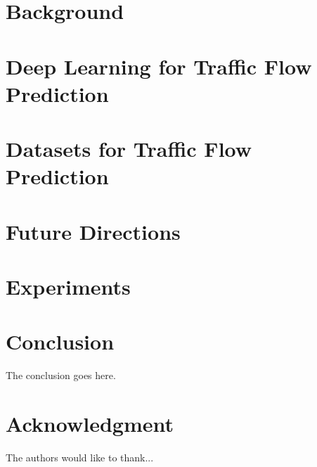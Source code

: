 \documentclass[conference]{IEEEtran}
\begin{document}
\section{Background}

\section{Deep Learning for Traffic Flow Prediction}

\section{Datasets for Traffic Flow Prediction}

\section{Future Directions}

\section{Experiments}

\section{Conclusion}
The conclusion goes here.




\section*{Acknowledgment}

The authors would like to thank...
\end{document}
